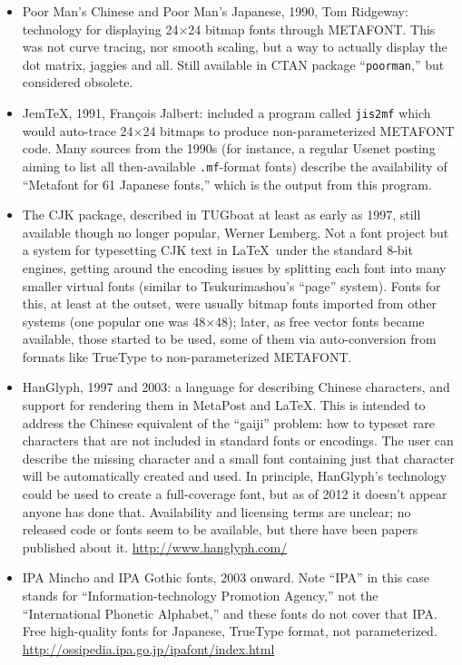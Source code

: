 \documentclass[14pt]{extarticle}
\begin{document}
\begin{itemize}
\item Poor Man's Chinese and Poor Man's Japanese, 1990, Tom Ridgeway:
technology for displaying 24×24 bitmap fonts through METAFONT.  This
was not curve tracing, nor smooth scaling, but a way to actually display
the dot matrix, jaggies and all.  Still available in CTAN package
``\texttt{poorman},'' but considered obsolete.

\item Jem\TeX, 1991, François Jalbert: included a program called
\texttt{jis2mf} which would auto-trace 24×24 bitmaps to produce
non-parameterized METAFONT code.  Many sources from the 1990s
(for instance, a regular Usenet posting
aiming to list all then-available \texttt{.mf}-format fonts) describe
the availability of ``Metafont for 61 Japanese fonts,'' which is the output
from this program.

\item The CJK package, described in TUGboat at least as early as 1997, still
available though no longer popular, Werner Lemberg.  Not a font project but
a system for typesetting CJK text in \LaTeX\ under the standard 8-bit
engines, getting around the encoding issues by splitting each font into many
smaller virtual fonts (similar to Tsukurimashou's ``page'' system).  Fonts
for this, at least at the outset, were usually bitmap fonts imported from
other systems (one popular one was 48×48); later, as free vector fonts
became available, those started to be used, some of them via auto-conversion
from formats like TrueType to non-parameterized METAFONT.

\item HanGlyph, 1997 and 2003: a language for describing Chinese
characters, and support for rendering them in MetaPost and \LaTeX.
This is intended to address the Chinese equivalent of the ``gaiji''
problem: how to typeset rare characters that are not included in
standard fonts or encodings.  The user can describe the missing
character and a small font containing just that character will be
automatically created and used.  In principle, HanGlyph's technology
could be used to create a full-coverage font, but as of 2012 it
doesn't appear anyone has done that.  Availability and licensing terms
are unclear; no released code or fonts seem to be available, but there
have been papers published about it. \url{http://www.hanglyph.com/}

\item IPA Mincho and IPA Gothic fonts, 2003 onward.  Note ``IPA'' in this
case stands for ``Information-technology Promotion Agency,'' not the
``International Phonetic Alphabet,'' and these fonts do not cover that IPA.
Free high-quality fonts for Japanese, TrueType format, not parameterized. 
\url{http://ossipedia.ipa.go.jp/ipafont/index.html}


\end{itemize}
\end{document}
